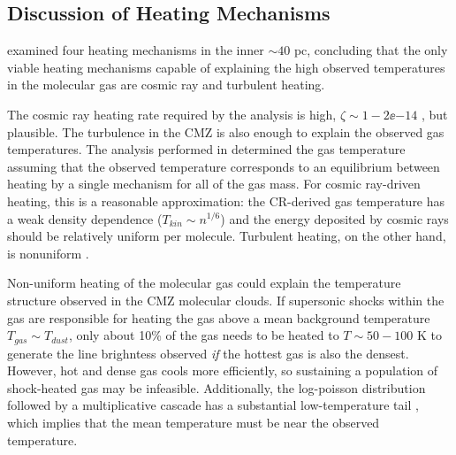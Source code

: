 \subsection{Discussion of Heating Mechanisms}
\citet{Ao2013a} examined four heating mechanisms in the inner $\sim 40$ pc,
concluding that the only viable heating mechanisms capable of explaining the
high observed temperatures in the molecular gas are cosmic ray and turbulent
heating.  

The cosmic ray heating rate required by the \citet{Ao2013a} analysis is high,
$\zeta\sim1-2\ee{-14}$ \pers, but plausible.  The turbulence in the CMZ is also
enough to explain the observed gas temperatures. 
The analysis performed in \citet{Ao2013a} determined the gas temperature
assuming that the observed temperature corresponds to an equilibrium between
heating by a single mechanism for all of the gas mass.  For cosmic ray-driven
heating, this is a reasonable approximation: the CR-derived gas temperature
has a weak density dependence ($T_{kin}\sim n^{1/6}$) and the energy deposited
by cosmic rays should be relatively uniform per molecule.  Turbulent heating,
on the other hand, is nonuniform \citep{Pan2009a}.

Non-uniform heating of the molecular gas could explain the temperature
structure observed in the CMZ molecular clouds.  If supersonic shocks within
the gas are responsible for heating the gas above a mean background temperature
$T_{gas} \sim T_{dust}$, only about 10\% of the gas needs to be heated to
$T\sim50-100$ K to generate the line brighntess observed \emph{if} the hottest
gas is also the densest.  However, hot and dense gas cools more efficiently, so
sustaining a population of shock-heated gas may be infeasible.  Additionally,
the log-poisson distribution followed by a multiplicative cascade has a substantial
low-temperature tail \citep{Pan2009a}, which implies that the mean temperature
must be near the observed temperature.


